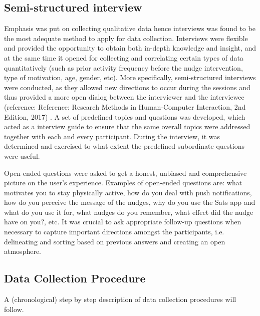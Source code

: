    \subsection{Semi-structured interview}
    Emphasis was put on collecting qualitative data hence interviews was found to be the most adequate method to apply for data collection. Interviews were flexible and provided the opportunity to obtain both in-depth knowledge and insight, and at the same time it opened for collecting and correlating certain types of data quantitatively (such as prior activity frequency before the nudge intervention,  type of motivation, age, gender, etc). More specifically, semi-structured interviews were conducted, as they allowed new directions to occur during the sessions and thus provided a more open dialog between the interviewer and the interviewee \cite{karl_chapter_nodate}(reference: Reference: Research Methods in Human-Computer Interaction, 2nd Edition, 2017) . A set of predefined topics and questions was developed, which acted as a interview guide to ensure that the same overall topics were addressed together with each and every participant. During the interview, it was determined and exercised to what extent the predefined subordinate questions were useful. 

    Open-ended questions were asked to get a honest, unbiased and comprehensive picture on the user’s experience. Examples of open-ended questions are: what motivates you to stay physically active, how do you deal with push notifications, how do you perceive the message of the nudges, why do you use the Sats app and what do you use it for, what nudges do you remember, what effect did the nudge have on you?, etc. It was crucial to ask appropriate follow-up questions when necessary to capture important directions amongst the participants, i.e. delineating and sorting based on previous answers and creating an open atmosphere.
 
    \subsection{Data Collection Procedure}
    A (chronological) step by step description of data collection procedures will follow.
    
